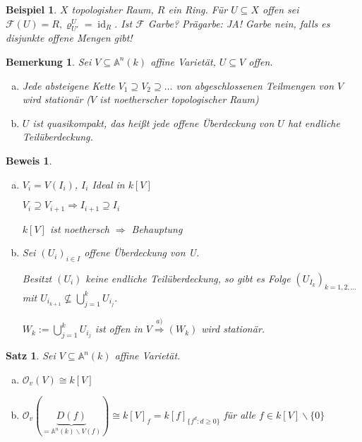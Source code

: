 \documentclass[a4paper, 12pt, numbers=noendperiod, chapterprefix=true]{scrbook}
\theoremstyle{break}
\newtheorem{Satz}{Satz}
\newtheorem{Bem}[Def]{Bemerkung}
\theoremstyle{nonumberbreak}
\newtheorem{nnBsp}{Beispiel}
\newtheorem{Bew}{Beweis}
\theoremstyle{nonumberplain}
\newcommand{\quot}[1]{\textrm{\glqq}{#1}\textrm{\grqq}}
\DeclareMathOperator{\id}{id}
\newcommand{\A}{\mathbb{A}}
\newcommand{\calF}{\mathcal{F}}
\newcommand{\calO}{\mathcal{O}}
\begin{document}
\begin{nnBsp}
$X$ topologisher Raum, $R$ ein Ring. F\"ur $U\subseteq X$ offen sei $\calF(U)=R, \varrho^U_{U'}=\id_R$. Ist $\calF$ Garbe? Pr\"agarbe: JA! Garbe nein, falls es disjunkte offene Mengen gibt!
\end{nnBsp}

\begin{Bem}\label{7.5}\label{bem7.5}
Sei $V\subseteq \A^n(k)$ affine Variet\"at, $U\subseteq V$ offen.\begin{enumerate}[a)]
\item
	Jede absteigene Kette $V_1 \supseteq V_2 \supseteq \dots $ von abgeschlossenen Teilmengen von $V$ wird station\"ar (\quot{$V$ ist noetherscher topologischer Raum})
	
\item
	$U$ ist quasikompakt, das hei\ss t jede offene \"Uberdeckung von $U$ hat endliche Teil\"uberdeckung.
\end{enumerate}\end{Bem}

\begin{Bew}\begin{enumerate}[a)]
\item
$V_i=V(I_i)$, $I_i$ Ideal in $k[V]$

$V_i\supseteq V_{i+1} \Rightarrow I_{i+1} \supseteq I_i$

$k[V]$ ist noethersch $\Rightarrow $ Behauptung

\item\label{bem7.5b}
Sei $(U_i)_{i\in I}$ offene \"Uberdeckung von U.

Besitzt $(U_i)$ keine endliche Teil\"uberdeckung, so gibt es Folge $(U_{I_k})_{k=1,2,\dots }$ mit $U_{i_{k+1}} \nsubseteq \bigcup_{j=1}^k U_{i_j}.$

$W_k:= \bigcup_{j=1}^k U_{i_j}$ ist offen in $V \stackrel{a)}{\Rightarrow} (W_k)$ wird station\"ar.
\end{enumerate}\end{Bew}

\begin{Satz}\label{satz5}
Sei $V\subseteq\A^n(k)$ affine Variet\"at.\begin{enumerate}[a)]
\item\label{satz5a}
	$\calO_v(V) \cong k[V]$

\item\label{satz5b}
	$\calO_v(\underbrace{D(f)}_{=\A^n(k)\backslash V(f)}) \cong k[V]_f = k[f]_{\{f^d:d\ge 0\}}$
	f\"ur alle $f\in k[V]\backslash\{0\}$
\end{enumerate}\end{Satz}
\end{document}
